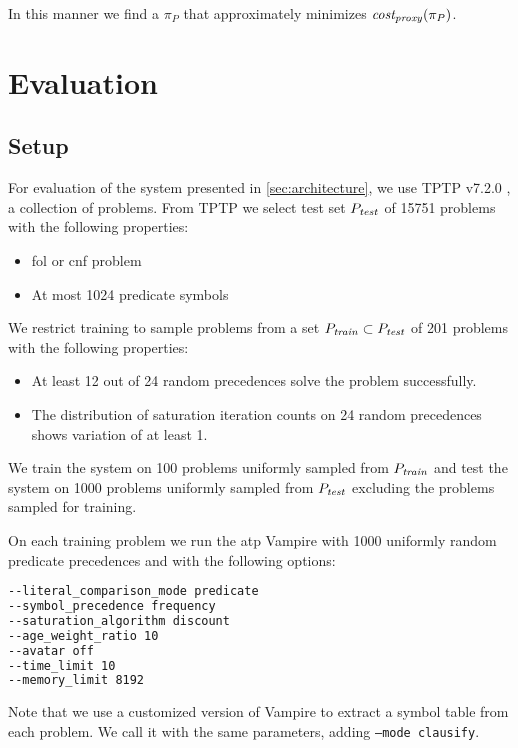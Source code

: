 In this manner we find a \(\pi_P\) that approximately minimizes \(\operatorname{\mathit{cost_{proxy}}}(\pi_P)\).

\section{Evaluation}
\label{sec:evaluation}

\subsection{Setup}

For evaluation of the system presented in \autoref{sec:architecture},
we use TPTP v7.2.0 \cite{?}, a collection of problems.
From TPTP we select test set \(P_{\mathit{test}}\) of 15751 problems with the following properties:

\begin{itemize}
	\item \gls{fol} or \gls{cnf} problem
	\item At most 1024 predicate symbols
\end{itemize}

We restrict training to sample problems from a set
\(P_{\mathit{train}} \subset P_{\mathit{test}}\) of 201 problems
with the following properties:

\begin{itemize}
	\item At least 12 out of 24 random precedences solve the problem successfully.
	\item The distribution of saturation iteration counts on 24 random precedences
	shows variation of at least 1.
\end{itemize}

We train the system on 100 problems uniformly sampled from \(P_{\mathit{train}}\)
and test the system on 1000 problems uniformly sampled from \(P_{\mathit{test}}\)
excluding the problems sampled for training.

On each training problem we run the \gls{atp} Vampire with 1000 uniformly random predicate precedences
and with the following options:

\begin{lstlisting}[language=sh]
--literal_comparison_mode predicate
--symbol_precedence frequency
--saturation_algorithm discount
--age_weight_ratio 10
--avatar off
--time_limit 10
--memory_limit 8192
\end{lstlisting}

Note that we use a customized version of Vampire to extract a symbol table from each problem.
We call it with the same parameters, adding \texttt{--mode clausify}.

